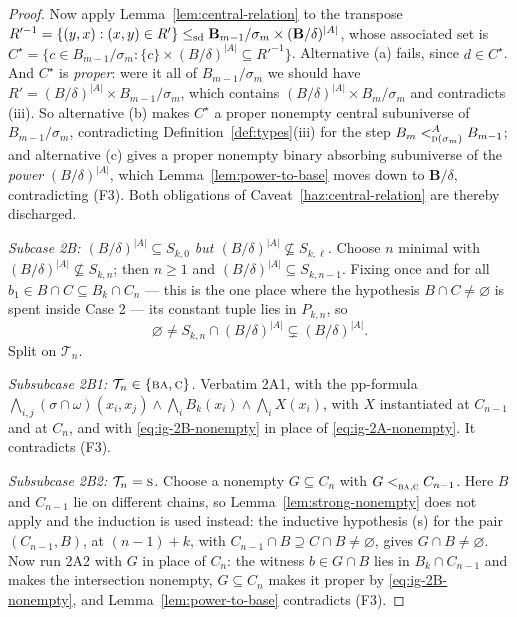 \begin{proof}
Now apply Lemma~\ref{lem:central-relation} to the transpose
$R'^{-1}=\{(y,x):(x,y)\in R'\}\sdle\mathbf B_{m-1}/\sigma_{m}\times
(\mathbf B/\delta)^{|A|}$, whose associated set is
$C^{\star}=\{c\in B_{m-1}/\sigma_{m}:\{c\}\times(B/\delta)^{|A|}\subseteq
R'^{-1}\}$. Alternative (a) fails, since $d\in C^{\star}$. And $C^{\star}$ is
\emph{proper}: were it all of $B_{m-1}/\sigma_{m}$ we should have
$R'=(B/\delta)^{|A|}\times B_{m-1}/\sigma_{m}$, which contains
$(B/\delta)^{|A|}\times B_{m}/\sigma_{m}$ and contradicts (iii). So
alternative (b) makes $C^{\star}$ a proper nonempty central subuniverse of
$B_{m-1}/\sigma_{m}$, contradicting Definition~\ref{def:types}(iii) for the
step $B_{m}\subt[A]{\TD(\sigma_{m})}B_{m-1}$; and alternative (c) gives a
proper nonempty binary absorbing subuniverse of the \emph{power}
$(B/\delta)^{|A|}$, which Lemma~\ref{lem:power-to-base} moves down to
$\mathbf B/\delta$, contradicting (F3). Both obligations of
Caveat~\ref{haz:central-relation} are thereby discharged.

\emph{Subcase 2B: $(B/\delta)^{|A|}\subseteq S_{k,0}$ but
$(B/\delta)^{|A|}\not\subseteq S_{k,\ell}$.} Choose $n$ minimal with
$(B/\delta)^{|A|}\not\subseteq S_{k,n}$; then $n\ge1$ and
$(B/\delta)^{|A|}\subseteq S_{k,n-1}$. Fixing once and for all $b_{1}\in
B\cap C\subseteq B_{k}\cap C_{n}$ --- this is the one place where the
hypothesis $B\cap C\neq\varnothing$ is spent inside Case 2 --- its constant
tuple lies in $P_{k,n}$, so
\begin{equation}\label{eq:ig-2B-nonempty}
  \varnothing\neq S_{k,n}\cap(B/\delta)^{|A|}\subsetneq(B/\delta)^{|A|} .
\end{equation}
Split on $\mathcal T_{n}$.

\emph{Subsubcase 2B1: $\mathcal T_{n}\in\{\TBA,\TC\}$.} Verbatim 2A1, with the
pp-formula
$\bigwedge_{i,j}(\sigma\cap\omega)(x_{i},x_{j})\wedge\bigwedge_{i}B_{k}(x_{i})
\wedge\bigwedge_{i}X(x_{i})$, with $X$ instantiated at $C_{n-1}$ and at
$C_{n}$, and with \eqref{eq:ig-2B-nonempty} in place of
\eqref{eq:ig-2A-nonempty}. It contradicts (F3).

\emph{Subsubcase 2B2: $\mathcal T_{n}=\TS$.} Choose a nonempty $G\subseteq
C_{n}$ with $G\subt{\TBA,\TC}C_{n-1}$. Here $B$ and $C_{n-1}$ lie on different
chains, so Lemma~\ref{lem:strong-nonempty} does not apply and the induction is
used instead: the inductive hypothesis (s) for the pair $(C_{n-1},B)$, at
$(n-1)+k$, with $C_{n-1}\cap B\supseteq C\cap B\neq\varnothing$, gives
$G\cap B\neq\varnothing$. Now run 2A2 with $G$ in place of $C_{n}$: the
witness $b\in G\cap B$ lies in $B_{k}\cap C_{n-1}$ and makes the intersection
nonempty, $G\subseteq C_{n}$ makes it proper by
\eqref{eq:ig-2B-nonempty}, and Lemma~\ref{lem:power-to-base} contradicts (F3).


\end{proof}
